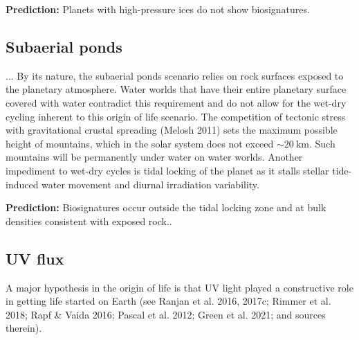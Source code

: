 \documentclass[modern,linenumbers]{aastex631}
\begin{document}
\textbf{Prediction:} Planets with high-pressure ices do not show biosignatures.


\subsection{Subaerial ponds}
...
By its nature, the subaerial ponds scenario relies on rock surfaces exposed to the planetary atmosphere.
Water worlds that have their entire planetary surface covered with water contradict this requirement and do not allow for the wet-dry cycling inherent to this origin of life scenario.
The competition of tectonic stress with gravitational crustal spreading (Melosh 2011) sets the maximum possible height of mountains, which in the solar system does not exceed $\sim \SI{20}{\kilo\meter}$.
Such mountains will be permanently under water on water worlds.
Another impediment to wet-dry cycles is tidal locking of the planet as it stalls stellar tide-induced water movement and diurnal irradiation variability.

\textbf{Prediction:} Biosignatures occur outside the tidal locking zone and at bulk densities consistent with exposed rock..

\subsection{UV flux}\label{sec:predictions:uv}
A major hypothesis in the origin of life is that UV light played a constructive role in getting life started on Earth (see Ranjan et al. 2016, 2017c; Rimmer et al. 2018; Rapf \& Vaida 2016; Pascal et al. 2012; Green et al. 2021; and sources therein).
\end{document}
